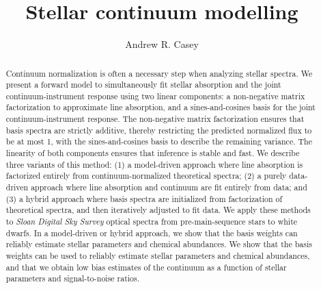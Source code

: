 \documentclass[modern]{aastex631}
\newcommand{\project}[1]{\textit{#1}}
\begin{document}
\title{\Huge Stellar continuum modelling}

\author[0000-0003-0174-0564]{Andrew R. Casey}


\begin{abstract}\noindent
Continuum normalization is often a necessary step when analyzing stellar spectra. 
We present a forward model to simultaneously fit stellar absorption and the joint continuum-instrument response using two linear components: a non-negative matrix factorization to approximate line absorption, and a sines-and-cosines basis for the joint continuum-instrument response.
The non-negative matrix factorization ensures that basis spectra are strictly additive, thereby restricting the predicted normalized flux to be at most 1, with the sines-and-cosines basis to describe the remaining variance.
The linearity of both components ensures that inference is stable and fast.
We describe three variants of this method:
    (1) a model-driven approach where line absorption is factorized entirely from continuum-normalized theoretical spectra;
    (2) a purely data-driven approach where line absorption and continuum are fit entirely from data;
    and
    (3) a hybrid approach where basis spectra are initialized from factorization of theoretical spectra, and then iteratively adjusted to fit data. 
We apply these methods to \project{Sloan Digital Sky Survey} optical spectra 
from pre-main-sequence stars to white dwarfs.
In a model-driven or hybrid approach, we show that the basis weights can reliably estimate stellar parameters and chemical abundances.
We show that the basis weights can be used to reliably estimate stellar parameters and chemical abundances, 
and that we obtain low bias estimates of the continuum as a function of stellar parameters and signal-to-noise ratios.
\end{abstract}
\end{document}
